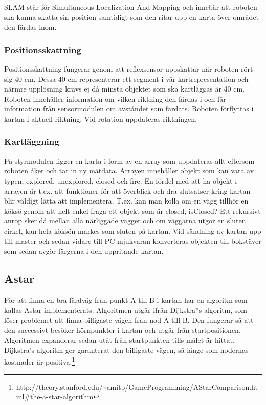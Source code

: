 \documentclass[a4paper,12pt,fleqn]{article}
\begin{document}
SLAM står för Simultaneous Localization And Mapping och innebär att roboten ska kunna skatta sin position samtidigt som den ritar upp en karta över området den färdas inom.

\subsubsection{Positionsskattning}
Positionsskattning fungerar genom att reflexsensor uppskattar när roboten rört sig 40 cm. Dessa 40 cm representerar ett segment i vår kartrepresentation och närmre upplösning krävs ej då minsta objektet som ska kartläggas är 40 cm. Roboten innehåller information om vilken riktning den färdas i och får information från sensormodulen om avståndet som färdats. Roboten förflyttas i kartan i aktuell riktning. Vid rotation uppdateras riktningen. 

\subsubsection{Kartläggning}
På styrmodulen ligger en karta i form av en array som uppdateras allt eftersom roboten åker och tar in ny mätdata. Arrayen innehåller objekt som kan vara av typen, explored, unexplored, closed och fire. En fördel med att ha objekt i arrayen är t.ex. att funktioner för att överblick och dra slutsatser kring kartan blir väldigt lätta att implementera. T.ex. kan man kolla om en vägg tillhör en köksö genom att helt enkel fråga ett objekt som är closed, isClosed? Ett rekursivt anrop sker då mellan alla närliggade vägger och om väggarna utgör en sluten cirkel, kan hela köksön markes som sluten på kartan. 
Vid sändning av kartan upp till master och sedan vidare till PC-mjukvaran konverteras objekten till bokstäver som sedan avgör färgerna i den uppritande kartan.

\subsection{Astar}
För att finna en bra färdväg från punkt A till B i kartan har en algoritm som kallas Astar implementerats. Algoritmen utgår ifrån Dijkstra''s algoritm, som löser problemet att finna billigaste vägen från nod A till B. Den fungerar så att den successivt besöker hörnpunkter i kartan och utgår från startpositionen. Algoritmen expanderar sedan utåt från startpunkten tills målet är hittat. Dijkstra’s algoritm ger garanterat den billigaste vägen, så länge som nodernas kostnader är positiva.\footnote{http://theory.stanford.edu/\textasciitilde amitp/GameProgramming/AStarComparison.html\#the-a-star-algorithm}
\end{document}
